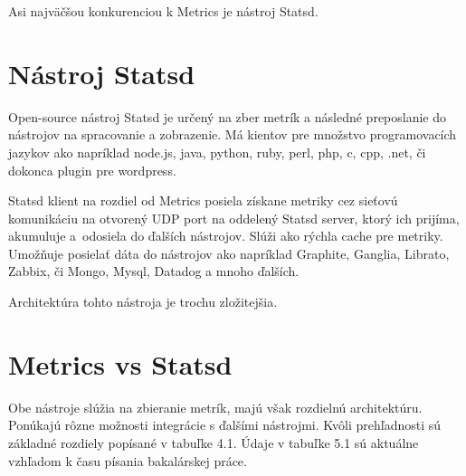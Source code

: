 \documentclass[a4paper, upjsfrontpage, disablespecwarning, thesismargins, thesislinespacing]{rnthesis}
\begin{document}
Asi najväčšou konkurenciou k Metrics je nástroj Statsd.


\section{Nástroj Statsd}

Open-source nástroj Statsd je určený na zber metrík a následné preposlanie do nástrojov na spracovanie a zobrazenie.
Má kientov pre množstvo programovacích jazykov ako napríklad node.js, java, python, ruby, perl, php, c, cpp, .net, či dokonca plugin pre wordpress. 

Statsd klient na rozdiel od Metrics posiela získane metriky cez sieťovú komunikáciu na otvorený UDP port na oddelený Statsd server, ktorý ich prijíma, akumuluje a~odosiela do ďalších nástrojov. 
Slúži ako rýchla cache pre metriky. 
Umožňuje posielať dáta do nástrojov ako napríklad Graphite, Ganglia, Librato, Zabbix, či Mongo, Mysql, Datadog a mnoho ďalších.

Architektúra tohto nástroja je trochu zložitejšia.


\section{Metrics vs Statsd}

Obe nástroje slúžia na zbieranie metrík, majú však rozdielnú architektúru. 
Ponúkajú rôzne možnosti integrácie s ďalšími nástrojmi. 
Kvôli prehľadnosti sú základné rozdiely popísané v tabuľke 4.1.
Údaje v tabuľke 5.1 sú aktuálne vzhľadom k času písania bakalárskej práce.
\end{document}
